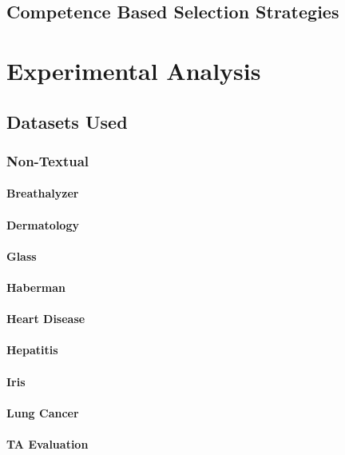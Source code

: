 \documentclass[a4paper,11pt]{report}
\begin{document}
\section{Competence Based Selection Strategies}
\chapter{Experimental Analysis}
\section{Datasets Used}
\subsection{Non-Textual}
\subsubsection*{Breathalyzer}\label{sec:breathalyzer}
\subsubsection*{Dermatology}\label{sec:dermatology}
\subsubsection*{Glass}\label{sec:glass}
\subsubsection*{Haberman}\label{sec:haberman}
\subsubsection*{Heart Disease}\label{sec:heart_disease}
\subsubsection*{Hepatitis}\label{sec:hepatitis}
\subsubsection*{Iris}\label{sec:iris}
\subsubsection*{Lung Cancer}\label{sec:lung_cancer}
\subsubsection*{TA Evaluation}\label{sec:taevaluation}
\end{document}
